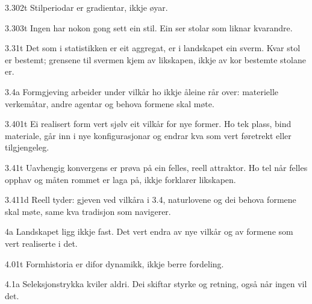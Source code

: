 \begin{formproposition}{3.302}{t}
Stilperiodar er gradientar, ikkje øyar.
\end{formproposition}

\begin{formproposition}{3.303}{t}
Ingen har nokon gong sett ein stil. Ein ser stolar som liknar kvarandre.
\end{formproposition}

\begin{formproposition}{3.31}{t}
Det som i statistikken er eit aggregat, er i landskapet ein sverm. Kvar stol er bestemt; grensene til svermen kjem av likskapen, ikkje av kor bestemte stolane er.
\end{formproposition}

\begin{formproposition}{3.4}{a}
Formgjeving arbeider under vilkår ho ikkje åleine rår over: materielle verkemåtar, andre agentar og behova formene skal møte.
\end{formproposition}

\begin{formproposition}{3.401}{t}
Ei realisert form vert sjølv eit vilkår for nye former. Ho tek plass, bind materiale, går inn i nye konfigurasjonar og endrar kva som vert føretrekt eller tilgjengeleg.
\end{formproposition}

\begin{formproposition}{3.41}{t}
Uavhengig konvergens er prøva på ein felles, reell attraktor. Ho tel når felles opphav og måten rommet er laga på, ikkje forklarer likskapen.
\end{formproposition}

\begin{formproposition}{3.411}{d}
Reell tyder: gjeven ved vilkåra i 3.4, naturlovene og dei behova formene skal møte, same kva tradisjon som navigerer.
\end{formproposition}

\begin{formproposition}{4}{a}
Landskapet ligg ikkje fast. Det vert endra av nye vilkår og av formene som vert realiserte i det.
\end{formproposition}

\begin{formproposition}{4.01}{t}
Formhistoria er difor dynamikk, ikkje berre fordeling.
\end{formproposition}

\begin{formproposition}{4.1}{a}
Seleksjonstrykka kviler aldri. Dei skiftar styrke og retning, også når ingen vil det.
\end{formproposition}

